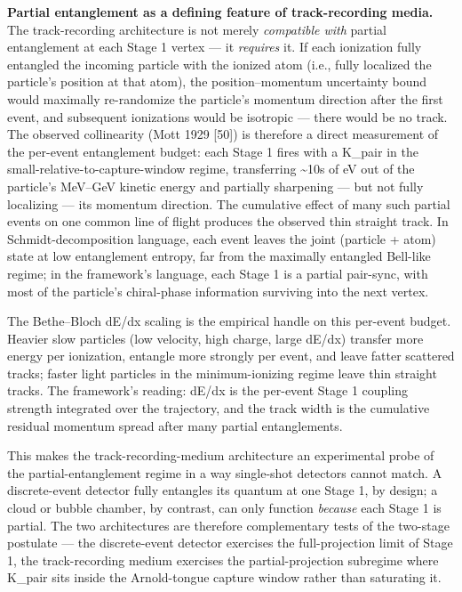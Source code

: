 \documentclass[
]{article}
\begin{document}
\textbf{Partial entanglement as a defining feature of track-recording
media.} The track-recording architecture is not merely \emph{compatible
with} partial entanglement at each Stage 1 vertex --- it \emph{requires}
it. If each ionization fully entangled the incoming particle with the
ionized atom (i.e., fully localized the particle's position at that
atom), the position--momentum uncertainty bound would maximally
re-randomize the particle's momentum direction after the first event,
and subsequent ionizations would be isotropic --- there would be no
track. The observed collinearity (Mott 1929 {[}50{]}) is therefore a
direct measurement of the per-event entanglement budget: each Stage 1
fires with a K\_pair in the small-relative-to-capture-window regime,
transferring \textasciitilde10s of eV out of the particle's MeV--GeV
kinetic energy and partially sharpening --- but not fully localizing ---
its momentum direction. The cumulative effect of many such partial
events on one common line of flight produces the observed thin straight
track. In Schmidt-decomposition language, each event leaves the joint
(particle + atom) state at low entanglement entropy, far from the
maximally entangled Bell-like regime; in the framework's language, each
Stage 1 is a partial pair-sync, with most of the particle's chiral-phase
information surviving into the next vertex.

The Bethe--Bloch dE/dx scaling is the empirical handle on this per-event
budget. Heavier slow particles (low velocity, high charge, large dE/dx)
transfer more energy per ionization, entangle more strongly per event,
and leave fatter scattered tracks; faster light particles in the
minimum-ionizing regime leave thin straight tracks. The framework's
reading: dE/dx is the per-event Stage 1 coupling strength integrated
over the trajectory, and the track width is the cumulative residual
momentum spread after many partial entanglements.

This makes the track-recording-medium architecture an experimental probe
of the partial-entanglement regime in a way single-shot detectors cannot
match. A discrete-event detector fully entangles its quantum at one
Stage 1, by design; a cloud or bubble chamber, by contrast, can only
function \emph{because} each Stage 1 is partial. The two architectures
are therefore complementary tests of the two-stage postulate --- the
discrete-event detector exercises the full-projection limit of Stage 1,
the track-recording medium exercises the partial-projection subregime
where K\_pair sits inside the Arnold-tongue capture window rather than
saturating it.
\end{document}
